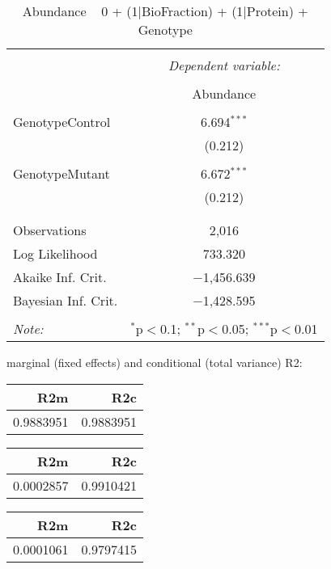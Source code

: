 \documentclass[11pt]{report}
\begin{document}
\begin{table}[!htbp] \centering 
  \caption{Abundance ~ 0 + (1|BioFraction) + (1|Protein) + Genotype} 
  \label{} 
\begin{tabular}{@{\extracolsep{5pt}}lc} 
\\[-1.8ex]\hline 
\hline \\[-1.8ex] 
 & \multicolumn{1}{c}{\textit{Dependent variable:}} \\ 
\cline{2-2} 
\\[-1.8ex] & Abundance \\ 
\hline \\[-1.8ex] 
 GenotypeControl & 6.694$^{***}$ \\ 
  & (0.212) \\ 
  & \\ 
 GenotypeMutant & 6.672$^{***}$ \\ 
  & (0.212) \\ 
  & \\ 
\hline \\[-1.8ex] 
Observations & 2,016 \\ 
Log Likelihood & 733.320 \\ 
Akaike Inf. Crit. & $-$1,456.639 \\ 
Bayesian Inf. Crit. & $-$1,428.595 \\ 
\hline 
\hline \\[-1.8ex] 
\textit{Note:}  & \multicolumn{1}{r}{$^{*}$p$<$0.1; $^{**}$p$<$0.05; $^{***}$p$<$0.01} \\ 
\end{tabular} 
\end{table} 
marginal (fixed effects) and conditional (total variance) R2:

\begin{tabular}{r|r}
\hline
R2m & R2c\\
\hline
0.9883951 & 0.9883951\\
\hline
\end{tabular}

\begin{tabular}{r|r}
\hline
R2m & R2c\\
\hline
0.0002857 & 0.9910421\\
\hline
\end{tabular}

\begin{tabular}{r|r}
\hline
R2m & R2c\\
\hline
0.0001061 & 0.9797415\\
\hline
\end{tabular}
\end{document}
